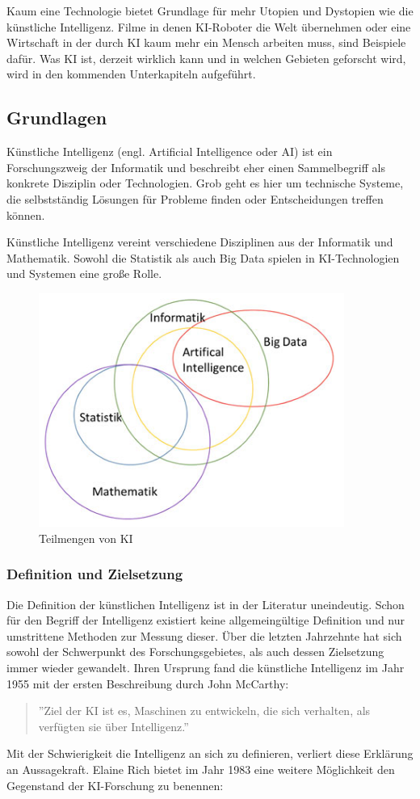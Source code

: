 \documentclass[a4paper,12pt, german]{report}
\begin{document}
Kaum eine Technologie bietet Grundlage für mehr Utopien und Dystopien wie die künstliche Intelligenz. Filme in denen KI-Roboter die Welt übernehmen oder eine Wirtschaft in der durch KI kaum mehr ein Mensch arbeiten muss, sind Beispiele dafür. Was KI ist, derzeit wirklich kann und in welchen Gebieten geforscht wird, wird in den kommenden Unterkapiteln aufgeführt. 

\subsection{Grundlagen}

Künstliche Intelligenz (engl. Artificial Intelligence oder AI) ist ein Forschungszweig der Informatik und beschreibt eher einen Sammelbegriff als konkrete Disziplin oder Technologien. Grob geht es hier um technische Systeme, die selbstständig Lösungen für Probleme finden oder Entscheidungen treffen können. \cite{01}\cite{10}

Künstliche Intelligenz vereint verschiedene Disziplinen aus der Informatik und Mathematik. Sowohl die Statistik als auch Big Data spielen in KI-Technologien und Systemen eine große Rolle.\cite{17}

\begin{figure}[H]
  \center
 \includegraphics[width=10cm]{images/KI-Teilmengen.png}
  \caption[Teilmengen von KI]{Teilmengen von KI \cite{17}}
\end{figure}


\subsubsection{Definition und Zielsetzung}
Die Definition der künstlichen Intelligenz ist in der Literatur uneindeutig. Schon für den Begriff der Intelligenz existiert keine allgemeingültige Definition und nur umstrittene Methoden zur Messung dieser. Über die letzten Jahrzehnte hat sich sowohl der Schwerpunkt des Forschungsgebietes, als auch dessen Zielsetzung immer wieder gewandelt. Ihren Ursprung fand die künstliche Intelligenz im Jahr 1955 mit der ersten Beschreibung durch John McCarthy:
\begin{quote}
  ''Ziel der KI ist es, Maschinen zu entwickeln, die sich verhalten, als verfügten sie über Intelligenz.''
\end{quote}
 Mit der Schwierigkeit die Intelligenz an sich zu definieren, verliert diese Erklärung an Aussagekraft. Elaine Rich bietet im Jahr 1983 eine weitere Möglichkeit den Gegenstand der KI-Forschung zu benennen: 
\end{document}
